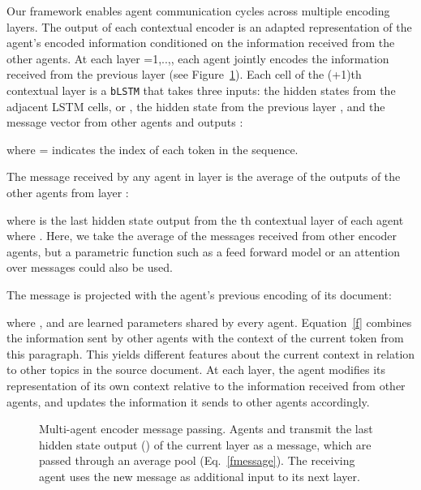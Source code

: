 \documentclass[11pt,a4paper]{article}
\begin{document}
Our framework enables agent communication cycles across multiple encoding layers. 
The output of each contextual encoder is an adapted representation of the agent's encoded information conditioned on the information received from the other agents.
At each layer =1,..,, each agent  jointly encodes the information received from the previous layer (see Figure~\ref{fpicmessagepassing}). 
Each cell of the (+1)th contextual layer is a \texttt{bLSTM} that takes three inputs: the hidden states from the adjacent LSTM cells,  or , the hidden state from the previous layer , and the message vector from other agents  and outputs :



\noindent where = indicates the index of each token in the sequence. 

The message  received by any agent  in layer  is the average of the outputs of the other agents from layer :



where  is the last hidden state output from the th contextual layer of each agent where . Here, we take the average of the messages received from other encoder agents, but a parametric function such as a feed forward model or an attention over messages could also be used. 


The message  is projected with the agent's previous encoding of its document:

where , and  are learned parameters shared by every agent. Equation~\eqref{f} combines the information sent by other agents with the context of the current token from this paragraph. This yields different features about the current context in relation to other topics in the source document. At each layer, the agent modifies its representation of its own context relative to the information received from other agents, and updates the information it sends to other agents accordingly.
 \begin{figure}[t]
\begin{center} 
\end{center} 
\vskip -0.19in
\caption{Multi-agent encoder message passing. Agents  and  transmit the last hidden state output () of the current layer  as a message, which are passed through an average pool (Eq.~\eqref{fmessage}). The receiving agent  uses the new message  as additional input to its next layer.}
\label{fpicmessagepassing}
\end{figure}
\end{document}
